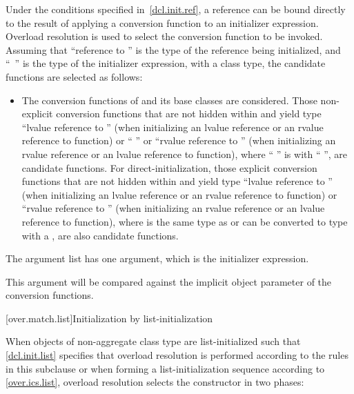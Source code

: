 \pnum
Under the conditions specified in~\ref{dcl.init.ref}, a reference can be bound directly
to the result of applying a conversion
function to an initializer expression.
Overload resolution is used to select the
conversion function to be invoked.
Assuming that ``reference to  '' is the
type of the reference being initialized, and
``\cv{}~'' is the type
of the initializer expression, with
a class type,
the candidate functions are selected as follows:
\begin{itemize}
\item
The conversion functions of
and its base classes are considered.
Those non-explicit conversion functions that are not hidden within
and yield type ``lvalue reference to  ''
(when initializing an lvalue reference or an rvalue reference to function) or
`` ''
or ``rvalue reference to  '' (when initializing an
rvalue reference or an lvalue reference to function),
where `` '' is 
with `` '',
are candidate functions. For direct-initialization, those explicit
conversion functions that are not hidden within  and yield
type ``lvalue reference to  ''
(when initializing an lvalue reference or an rvalue reference to function)
or ``rvalue reference to  ''
(when initializing an rvalue reference or an lvalue reference to function),
where  is the same type as  or can be
converted to type  with a , are also candidate functions.

\end{itemize}

\pnum
The argument list has one argument, which is the initializer expression.
\begin{note}
This argument will be compared against
the implicit object parameter of the conversion functions.
\end{note}

[over.match.list]{Initialization by list-initialization}%

\pnum
When objects of non-aggregate class type  are
list-initialized such that \ref{dcl.init.list} specifies that overload resolution
is performed according to the rules in this subclause
or when forming a list-initialization sequence according to \ref{over.ics.list},
overload resolution selects the constructor in two phases:

